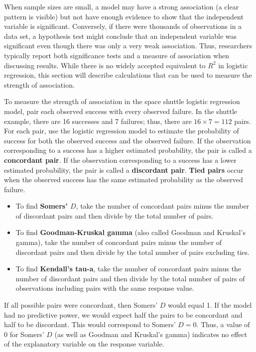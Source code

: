 \documentclass[
]{report}
\begin{document}
When sample sizes are small, a model may have a strong association (a clear pattern is visible) but not have enough evidence to show that the independent variable is significant. Conversely, if there were thousands of observations in a data set, a hypothesis test might conclude that an independent variable was significant even though there was only a very weak association. Thus, researchers typically report both significance tests and a measure of association when discussing results. While there is no widely accepted equivalent to \(R^2\) in logistic regression, this section will describe calculations that can be used to measure the strength of association.

To measure the strength of association in the space shuttle logistic regression model, pair each observed success with every observed failure. In the shuttle example, there are 16 successes and 7 failures; thus, there are \(16 \times 7 = 112\) pairs. For each pair, use the logistic regression model to estimate the probability of success for both the observed success and the observed failure. If the observation corresponding to a success has a higher estimated probability, the pair is called a \textbf{concordant pair}. If the observation corresponding to a success has a lower estimated probability, the pair is called a \textbf{discordant pair}. \textbf{Tied pairs} occur when the observed success has the same estimated probability as the observed failure.

\begin{itemize}
  \item To find \textbf{Somers’ $D$}, take the number of concordant pairs minus the number of discordant pairs and then divide by the total number of pairs.
  \item To find \textbf{Goodman-Kruskal gamma} (also called Goodman and Kruskal’s gamma), take the number of concordant pairs minus the number of discordant pairs and then divide by the total number of pairs excluding ties.
  \item To find \textbf{Kendall’s tau-a}, take the number of concordant pairs minus the number of discordant pairs and then divide by the total number of pairs of observations including pairs with the same response value.
\end{itemize}

If all possible pairs were concordant, then Somers' \(D\) would equal 1. If the model had no predictive power, we would expect half the pairs to be concordant and half to be discordant. This would correspond to Somers' \(D = 0\). Thus, a value of 0 for Somers' \(D\) (as well as Goodman and Kruskal's gamma) indicates no effect of the explanatory variable on the response variable.
\end{document}
